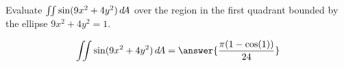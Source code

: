 \documentclass{ximera}
\author{David Guichard \and Neal Koblitz \and H. Jerome Keisler \and Albert Scheller \and Barry Balof \and Mike Wills \and Matthew Carr}
\begin{document}
\begin{exercise}




Evaluate $\iint \sin(9x^2+4y^2) \mathop{}\!d\! A$ over the region in the first quadrant bounded by the ellipse $9x^2+4y^2=1$.

\begin{prompt}
\[
\iint \sin(9x^2+4y^2)   \d A=\answer{\frac{\pi(1-\cos(1))}{24}}
\]
\end{prompt}



\end{exercise}
\end{document}
